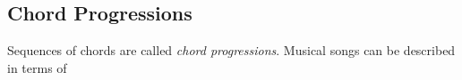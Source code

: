 \subsection{Chord Progressions}

Sequences of chords are called \textit{chord progressions}. Musical songs can be described in terms of 